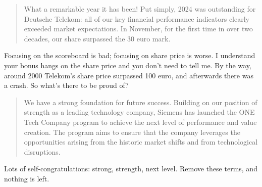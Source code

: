 \begin{quote}
    What a remarkable year it has been! Put simply, 2024 was outstanding for Deutsche Telekom: all of our key financial performance indicators clearly exceeded market expectations. In November, for the first time in over two decades, our share surpassed the 30 euro mark.
\end{quote}

Focusing on the scoreboard is bad; focusing on share price is worse. I understand your bonus hangs on the share price and you don't need to tell me. By the way, around 2000 Telekom's share price surpassed 100 euro, and afterwards there was a crash. So what's there to be proud of?

\begin{quote}
    We have a strong foundation for future success. Building on our position of 
strength as a leading technology company, Siemens has launched the 
ONE Tech Company program to achieve the next level of performance and value 
creation. The program aims to ensure that the company leverages the 
opportunities arising from the historic market shifts and from technological 
disruptions. 
\end{quote}

Lots of self-congratulations: strong, strength, next level. Remove these terms, and nothing is left.
